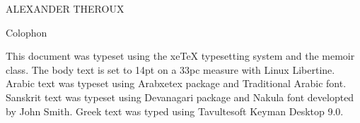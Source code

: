 \documentclass[a4paper,14pt,extrafontsizes,openany]{memoir}
\begin{document}
\frontmatter

\pagestyle{empty}
\begin{center}
  \LARGE{ALEXANDER THEROUX} \par \vspace{1.2in} 
   \par \vspace{2in}
\end{center}


\clearpage
\pagestyle{empty}
\null\vfil
\vfil

\clearpage
{}
\pagestyle{headings}



\tableofcontents*   %


\mainmatter
{}
\pagestyle{ocd}



\backmatter

\printindex

\cleardoublepage
\pagestyle{empty}
\null\vfil

\begin{adjustwidth}{1in}{1in}
\begin{center}
{\Large\textsf{Colophon}}
\end{center}
\begin{center}
  This document was typeset using the xeTeX typesetting system
  and the memoir class. The body text is set to 14pt on a
  33pc measure with Linux Libertine. Arabic text was typeset using Arabxetex
	package and Traditional Arabic font. Sanskrit text was typeset using
	Devanagari package and Nakula font developted by John Smith.
	Greek text was typed using Tavultesoft Keyman Desktop 9.0.
\end{center}
\end{adjustwidth}

\vfil
\end{document}
